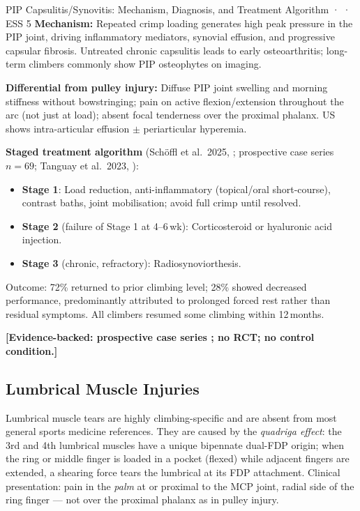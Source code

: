 \begin{evidencebox}{PIP Capsulitis/Synovitis: Mechanism, Diagnosis, and Treatment Algorithm · \evidencebacked · ESS 5}
\textbf{Mechanism:} Repeated crimp loading generates high peak pressure in the PIP joint, driving inflammatory mediators, synovial effusion, and progressive capsular fibrosis. Untreated chronic capsulitis leads to early osteoarthritis; long-term climbers commonly show PIP osteophytes on imaging.

\textbf{Differential from pulley injury:} Diffuse PIP joint swelling and morning stiffness without bowstringing; pain on active flexion/extension throughout the arc (not just at load); absent focal tenderness over the proximal phalanx. US shows intra-articular effusion $\pm$ periarticular hyperemia.

\textbf{Staged treatment algorithm} (Sch\"{o}ffl et al.\ 2025, \cite{SLL+25}; prospective case series $n=69$; Tanguay et al.\ 2023, \cite{Vag23}):
\begin{itemize}[leftmargin=1.5em,noitemsep]
  \item \textbf{Stage 1}: Load reduction, anti-inflammatory (topical/oral short-course), contrast baths, joint mobilisation; avoid full crimp until resolved.
  \item \textbf{Stage 2} (failure of Stage 1 at 4--6\,wk): Corticosteroid or hyaluronic acid injection.
  \item \textbf{Stage 3} (chronic, refractory): Radiosynoviorthesis.
\end{itemize}
Outcome: 72\% returned to prior climbing level; 28\% showed decreased performance, predominantly attributed to prolonged forced rest rather than residual symptoms. All climbers resumed some climbing within 12\,months.

\textbf{[Evidence-backed: prospective case series \cite{SLL+25}; no RCT; no control condition.]}
\end{evidencebox}

\subsection{Lumbrical Muscle Injuries}
\label{subsec:lumbrical}

Lumbrical muscle tears are highly climbing-specific and are absent from most general sports medicine references. They are caused by the \textit{quadriga effect}: the 3rd and 4th lumbrical muscles have a unique bipennate dual-FDP origin; when the ring or middle finger is loaded in a pocket (flexed) while adjacent fingers are extended, a shearing force tears the lumbrical at its FDP attachment. Clinical presentation: pain in the \textit{palm} at or proximal to the MCP joint, radial side of the ring finger --- not over the proximal phalanx as in pulley injury.

